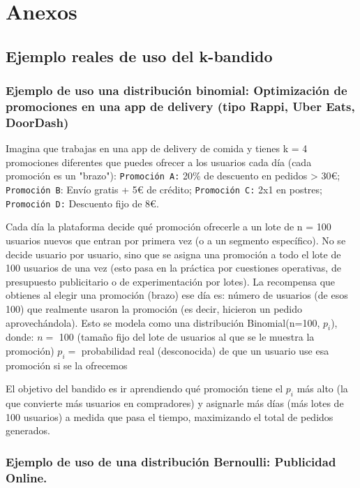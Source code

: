 \documentclass[a4paper, 11pt]{article}
\begin{document}
\newpage

\section{Anexos}



\subsection{Ejemplo reales de uso del k-bandido}\label{sec:ejem-k-bandidos}

\subsubsection*{Ejemplo de uso una distribución binomial: Optimización de promociones en una app de delivery (tipo Rappi, Uber Eats, DoorDash)}


Imagina que trabajas en una app de delivery de comida y tienes k = 4 promociones diferentes que puedes ofrecer a los usuarios cada día (cada promoción es un "brazo"):
\texttt{Promoción A:} 20\% de descuento en pedidos > 30€; 
\texttt{Promoción B}: Envío gratis + 5€ de crédito;
\texttt{Promoción C:} 2x1 en postres;
\texttt{Promoción D:} Descuento fijo de 8€. 

Cada día la plataforma decide qué promoción ofrecerle a un lote de n = 100 usuarios nuevos que entran por primera vez (o a un segmento específico).
No se decide usuario por usuario, sino que se asigna una promoción a todo el lote de 100 usuarios de una vez (esto pasa en la práctica por cuestiones operativas, de presupuesto publicitario o de experimentación por lotes).
La recompensa que obtienes al elegir una promoción (brazo) ese día es:
número de usuarios (de esos 100) que realmente usaron la promoción (es decir, hicieron un pedido aprovechándola).
Esto se modela como una distribución Binomial(n=100, $p_i$), donde:
$n =$ 100 (tamaño fijo del lote de usuarios al que se le muestra la promoción)
$p_i =$ probabilidad real (desconocida) de que un usuario use esa promoción si se la ofrecemos

El objetivo del bandido es ir aprendiendo qué promoción tiene el $p_i$ más alto (la que convierte más usuarios en compradores) y asignarle más días (más lotes de 100 usuarios) a medida que pasa el tiempo, maximizando el total de pedidos generados.


\subsubsection*{Ejemplo de uso de una distribución Bernoulli: Publicidad Online.}
  
\end{document}
